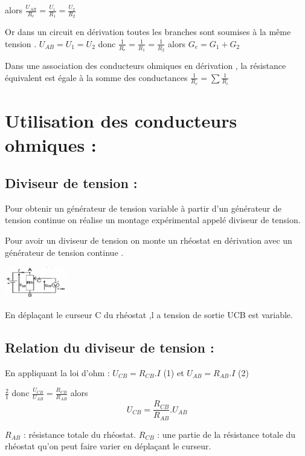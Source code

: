 \documentclass[12pt]{article}
\begin{document}
   alors $\frac{U_{AB}}{R_e} = \frac{U_1}{R_1} = \frac{U_2}{R_2}$

   Or dans un circuit en dérivation toutes les branches sont soumises à la même tension . $U_{AB} = U_1 = U_2$
   donc   $\frac{1}{R_e} = \frac{1}{R_1} = \frac{1}{R_2}$ alors  $G_e = G_1 + G_2$
\begin{tcolorbox}{ }
  Dans une association des conducteurs ohmiques en dérivation , la résistance équivalent est égale à la somme des conductances $\frac{1}{R_e} = \sum \frac{1}{R_i}$
\end{tcolorbox}

  \section{Utilisation des conducteurs ohmiques : }
\subsection{Diviseur de tension :}
Pour obtenir un générateur de tension variable à partir d'un générateur de tension continue on réalise un montage expérimental appelé diviseur de tension.

Pour avoir un diviseur de tension on monte un rhéostat en dérivation avec un générateur de tension continue .
\begin{center}
\includegraphics[width=0.2\textwidth]{./img/diviseur_Tension.png}
\end{center}
En déplaçant le curseur C du rhéostat ,l a tension de sortie UCB est variable.
\subsection {Relation du diviseur de tension :}
En appliquant la loi d'ohm : $U_{CB} = R_{CB}.I $ (1) et $U_{AB} = R_{AB}.I$ (2)

$\frac{2}{1}$ donc $\frac{U_{CB}}{U_{AB}} =\frac{R_{CB}}{R_{AB}} $
alors $$U_{CB} = \frac{R_{CB}}{R_{AB}}.U_{AB}$$

$R_{AB}$ : résistance totale du rhéostat.
$R_{CB}$ : une partie de la résistance totale du rhéostat qu'on peut faire varier en déplaçant le curseur.
\end{document}
